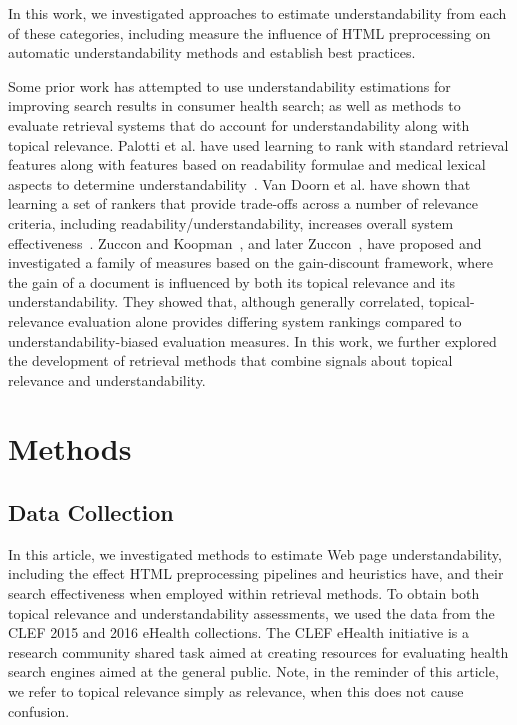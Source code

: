\documentclass[10pt,a4paper]{article}
\begin{document}
In this work, we investigated approaches to estimate understandability from each of these categories, including measure the influence of HTML preprocessing on automatic understandability methods and establish best practices. 

Some prior work has attempted to use understandability estimations for improving search results in consumer health search; as well as methods to evaluate retrieval systems that do account for understandability along with topical relevance. Palotti et al. have used learning to rank with standard retrieval features along with features based on readability formulae and medical lexical aspects to determine understandability~\cite{palotti2016ranking}. Van Doorn et al. have shown that learning a set of rankers that provide trade-offs across a number of relevance criteria, including readability/understandability, increases overall system effectiveness~\cite{van2016balancing}.
Zuccon and Koopman~\cite{zuccon14}, and later Zuccon~\cite{zuccon2016understandability}, have proposed and investigated a family of measures based on the gain-discount framework, where the gain of a document is influenced by both its topical relevance and its understandability. They showed that, although generally correlated, topical-relevance evaluation alone provides differing system rankings compared to understandability-biased evaluation measures. 
In this work, we further explored the development of retrieval methods that combine signals about topical relevance and understandability. 


\section*{Methods}
\label{sec:data}

\subsection*{Data Collection}

In this article, we investigated methods to estimate Web page understandability, including the effect HTML preprocessing pipelines and heuristics have, and their search effectiveness when employed within retrieval methods. To obtain both topical relevance and  understandability assessments, we used the data from the CLEF 2015 and 2016 eHealth collections. The CLEF eHealth initiative is a research community shared task aimed at creating resources for evaluating health search engines aimed at the general public.  Note, in the reminder of this article, we refer to topical relevance simply as relevance, when this does not cause confusion.
\end{document}
